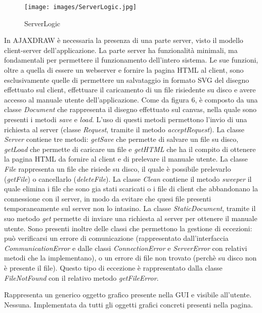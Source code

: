 \newpage
{}
\begin{figure}[!ht]
\centering
\texttt{[image: images/ServerLogic.jpg]}\\
\caption{ServerLogic}
\end{figure}

In AJAXDRAW \`e necessaria la presenza di una parte server, visto il modello client-server dell'applicazione. La parte server ha funzionalit\`a minimali, ma fondamentali per permettere il funzionamento dell'intero sistema. Le sue funzioni, oltre a quella di essere un webserver e fornire la pagina HTML al client, sono esclusivamente quelle di permettere un salvataggio in formato SVG del disegno effettuato sul client, effettuare il caricamento di un file risiedente su disco e avere accesso al manuale utente dell'applicazione. Come da figura 6, \`e composto da una classe \textit{Document} che rappresenta il disegno effettuato sul canvas, nella quale sono presenti i metodi \textit{save} e \textit{load}. L'uso di questi metodi permettono l'invio di una richiesta al server (classe \textit{Request}, tramite il metodo \textit{acceptRequest}). La classe \textit{Server} contiene tre metodi: \textit{getSave} che permette di salvare un file su disco, \textit{getLoad} che permette di caricare un file e \textit{getHTML} che ha il compito di ottenere la pagina HTML da fornire al client e di prelevare il manuale utente. La classe \textit{File} rappresenta un file che risiede su disco, il quale \`e possibile prelevarlo (\textit{getFile}) o cancellarlo (\textit{deleteFile}). La classe \textit{Clean} contiene il metodo \textit{sweeper} il quale elimina i file che sono gia stati scaricati o i file di client che abbandonano la connessione con il server, in modo da evitare che quesi file presenti temporaneamente sul server non lo intasino. La classe \textit{StaticDocument}, tramite il suo metodo \textit{get} permette di inviare una richiesta al server per ottenere il manuale utente. Sono presenti inoltre delle classi che permettono la gestione di eccezioni: pu\`o verificarsi un errore di comunicazione (rappresentato dall'interfaccia \textit{CommunicationError} e dalle classi \textit{ConnectionError} e \textit{ServerError} con relativi metodi che la implementano), o un errore di file non trovato (perch\`e su disco non \`e presente il file). Questo tipo di eccezione \`e rappresentato dalla classe \textit{FileNotFound} con il relativo metodo \textit{getFileError}. 


Rappresenta un generico oggetto grafico presente nella GUI e visibile all'utente.
Nessuna.
Implementata da tutti gli oggetti grafici concreti presenti nella pagina.

